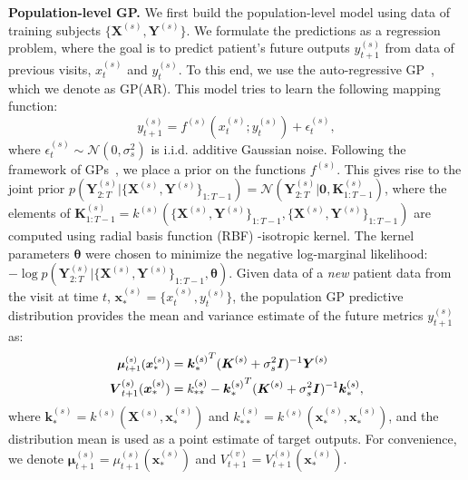\documentclass{article}
\newcommand{\vect}[1]{\boldsymbol{#1}}
\begin{document}
 {\bf Population-level GP.} We first build the population-level model using data of training subjects $\{\vect{X}^{(s)},\vect{Y}^{(s)}\}$. We formulate the predictions as a regression problem, where the goal is to predict patient's future outputs $y_{t+1}^{(s)}$ from data of previous visits, $x_{t}^{(s)}$ and $y_{t}^{(s)}$. To this end, we use the auto-regressive GP~\cite{candela2003propagation}, which we denote as GP(AR). This model tries to learn the following mapping function:
\begin{equation}
 y_{t+1}^{(s)} = f^{(s)}(x_{t}^{(s)};y_{t}^{(s)}) + \epsilon_{t}^{(s)},
\end{equation}
where $\epsilon_t^{(s)}\sim \mathcal{N}(0, \sigma^2_{s})$ is i.i.d. additive Gaussian noise. Following the framework of GPs~\cite{rasmussen2006gaussian}, we place a prior on the functions $f^{(s)}$. This gives rise to the joint prior $p(\vect{Y}^{(s)}_{2:T}|\{\vect{X}^{(s)},\vect{Y}^{(s)}\}_{1:T-1}) = \mathcal{N}(\vect{Y}^{(s)}_{2:T}|\vect{0}, \vect{K}^{(s)}_{1:T-1})$, where the elements of $\vect{K}^{(s)}_{1:T-1} = k^{(s)}(\{\vect{X}^{(s)},\vect{Y}^{(s)}\}_{1:T-1},\{\vect{X}^{(s)},\vect{Y}^{(s)}\}_{1:T-1})$ are computed using radial basis function (RBF) -isotropic kernel. 
The kernel parameters $\vect{\theta}$ were chosen to minimize the negative log-marginal likelihood: $-\log p(\vect{Y}^{(s)}_{2:T}|\{\vect{X}^{(s)},\vect{Y}^{(s)}\}_{1:T-1}, \vect{\theta})$. Given data of a {\it new} patient data from the visit at time $t$, $\vect{x}_\ast^{(s)}=\{x_{t}^{(s)},y_{t}^{(s)}\}$, the population GP predictive distribution provides the mean and variance estimate of the future metrics $y_{t+1}^{(s)}$ as:
\begin{align}
\small
\label{post_mu}\vect{\mu}_{t+1}^{(s)}(\vect{x}_\ast^{(s)}) &= {\vect{k}_\ast^{(s)}}^T (\vect{K}^{(s)} + \sigma_s^2\vect{I})^{-1}\vect{Y}^{(s)} \\ 
\label{post_s}\vect{V}_{t+1}^{(s)}(\vect{x}_\ast^{(s)}) &= k_{\ast\ast}^{(s)} - 
{\vect{k}_\ast^{(s)}}^T (\vect{K}^{(s)} + \sigma_s^2\vect{I})^{-1}
\vect{k}_\ast^{(s)},
\end{align}
%
where {\small $\vect{k}_\ast^{(s)} = k^{(s)}(\vect{X}^{(s)}, \vect{x}_\ast^{(s)})$} and {\small $k_{\ast\ast}^{(s)} = k^{(s)}(\vect{x}_\ast^{(s)}, \vect{x}_\ast^{(s)})$}, and the distribution mean is used as a point estimate of target outputs. For convenience, we denote $\vect{\mu}_{t+1}^{(s)} = \mu_{t+1}^{(s)}(\vect{x}_\ast^{(s)})$ and $V^{(v)}_{t+1} = V_{t+1}^{(s)}(\vect{x}_\ast^{(s)})$.
\end{document}
